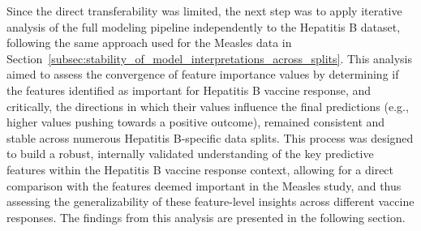 \documentclass[12pt,a4paper]{report}
\begin{document}
\noindent
Since the direct transferability was limited, the next step was to apply iterative analysis of the full modeling pipeline independently to the Hepatitis B dataset, following the same approach used for the Measles data in Section~\ref{subsec:stability_of_model_interpretations_across_splits}. This analysis aimed to assess the convergence of feature importance values by determining if the features identified as important for Hepatitis B vaccine response, and critically, the directions in which their values influence the final predictions (e.g., higher values pushing towards a positive outcome), remained consistent and stable across numerous Hepatitis B-specific data splits. This process was designed to build a robust, internally validated understanding of the key predictive features within the Hepatitis B vaccine response context, allowing for a direct comparison with the features deemed important in the Measles study, and thus assessing the generalizability of these feature-level insights across different vaccine responses. The findings from this analysis are presented in the following section.
\end{document}
